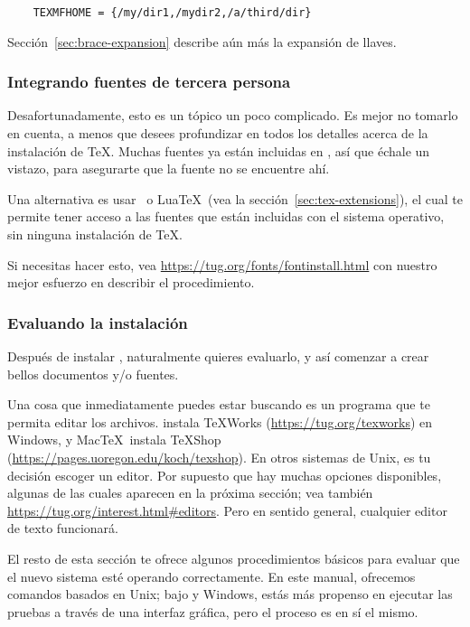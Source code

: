 \documentclass{article}
\begin{document}
\begin{verbatim}
	TEXMFHOME = {/my/dir1,/mydir2,/a/third/dir}
\end{verbatim}

Sección~\ref{sec:brace-expansion} describe aún más la expansión de llaves. 

\subsubsection{Integrando fuentes de tercera persona}

Desafortunadamente, esto es un tópico un poco complicado. Es mejor no
tomarlo en cuenta, a menos que desees profundizar en todos los
detalles acerca de la instalación de \TeX{}. Muchas fuentes ya están
incluidas en \TL, así que échale un vistazo, para asegurarte que la
fuente no se encuentre ahí.

Una alternativa es usar \XeTeX\ o Lua\TeX\ (vea la
sección~\ref{sec:tex-extensions}), el cual te permite tener acceso a
las fuentes que están incluidas con el sistema operativo, sin ninguna
instalación de \TeX. 

Si necesitas hacer esto, vea
\url{https://tug.org/fonts/fontinstall.html} con nuestro mejor esfuerzo
en describir el procedimiento. 

\subsubsection{Evaluando la instalación}
\label{sec:test-install}

Después de instalar \TL{}, naturalmente quieres evaluarlo, y así
comenzar a crear bellos documentos y\slash o fuentes. 

Una cosa que inmediatamente puedes estar buscando es un programa que te
permita editar los archivos. \TL{} instala \TeX{}Works
(\url{https://tug.org/texworks}) en Windows, y Mac\TeX\ instala TeXShop
(\url{https://pages.uoregon.edu/koch/texshop}). En otros sistemas de
Unix, es tu decisión escoger un editor. Por supuesto que hay muchas
opciones disponibles, algunas de las cuales aparecen en la próxima
sección; vea también \url{https://tug.org/interest.html#editors}. Pero
en sentido general, cualquier editor de texto funcionará.

El resto de esta sección te ofrece algunos procedimientos básicos para
evaluar que el nuevo sistema esté operando correctamente. En este
manual, ofrecemos comandos basados en Unix; bajo \MacOSX{} y Windows, estás
más propenso en ejecutar las pruebas a través de una interfaz gráfica,
pero el proceso es en sí el mismo. 
\end{document}
